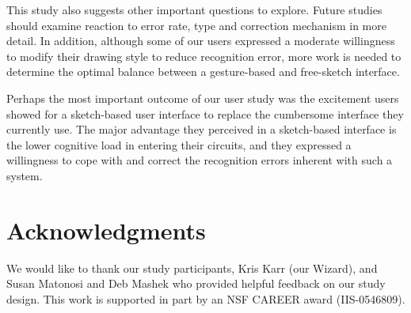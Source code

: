 \documentclass{egpubl}
\begin{document}

This study also suggests other important questions to explore.  Future
studies should examine reaction to error rate, type and correction
mechanism in more detail.  In addition, although some of our users
expressed a moderate willingness to modify their drawing style to
reduce recognition error, more work is needed to determine the optimal
balance between a gesture-based and free-sketch interface.

Perhaps the most important outcome of our user study was the excitement
users showed for a sketch-based user interface to replace the
cumbersome interface they currently use.  The major advantage they
perceived in a sketch-based interface is the lower cognitive load in
entering their circuits, and they expressed a willingness to cope with
and correct the recognition errors inherent with such a system.



\section{Acknowledgments}
We would like to thank our study participants, Kris Karr (our Wizard),
and Susan Matonosi and Deb Mashek who provided helpful feedback on our
study design.  This work is supported in part by an NSF CAREER award
(IIS-0546809).






%
%

\end{document}
